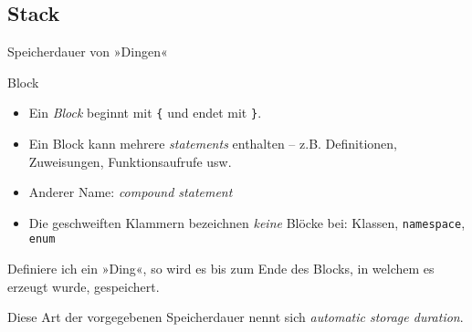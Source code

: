 \subsection{Stack}

\newcommand{\stackframe}[3]{
	\begin{frame}[t]{#1}
		\begin{columns}
			\column[t]{0.25\textwidth}
				\ifthenelse{ \equal{#2}{\empty} }{}
				{
					\texttt{[image: images/\#2]}
				}
			
			\column[t]{0.75\textwidth}
				\begin{block}{}
					#3
				\end{block}
		\end{columns}
	\end{frame}
}



\begin{frame}[fragile]{Speicherdauer von »Dingen«}
	\begin{block}{Block}
		\begin{itemize}
			\item Ein \emph{Block} beginnt mit \verb|{| und endet mit \verb|}|.
			\item<3-> {\footnotesize Ein Block kann mehrere \emph{statements} enthalten -- z.B. Definitionen, Zuweisungen, Funktionsaufrufe usw.}
			\item<3-> {\footnotesize Anderer Name: \emph{compound statement}}
			\item<3-> {\footnotesize Die geschweiften Klammern bezeichnen \emph{keine} Blöcke bei: Klassen, \verb|namespace|, \verb|enum|}
		\end{itemize}
	\end{block}
	
	\vspace{1em}
	
	Definiere ich ein »Ding«, so wird es bis zum Ende des Blocks, in welchem es erzeugt wurde, gespeichert.
	
	\vspace{0.5em}
	
	Diese Art der vorgegebenen Speicherdauer nennt sich \emph{automatic storage duration}.
\end{frame}

